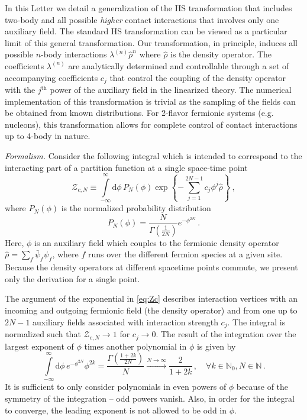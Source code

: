 \documentclass[aps,prl,twocolumn,showpacs,superscriptaddress,groupedaddress, final, nofootinbib]{revtex4}  %
\newcommand{\diff}[1]{\text{d}{#1} \, }
\newcommand{\Z}{\ensuremath{\mathcal{Z}}}
\begin{document}
In this Letter we detail a generalization of the HS transformation that includes two-body and all possible \emph{higher} contact interactions that involves only one auxiliary field.
The standard HS transformation can be viewed as a particular limit of this general transformation.
Our transformation, in principle, induces all possible $n$-body interactions
    $\lambda^{(n)}\hat{\rho}^n$
where $\hat{\rho}$ is the density operator.
The coefficients $\lambda^{(n)}$ are analytically determined and controllable through a set of accompanying coefficients $c_j$ that control the coupling of the density operator with the $j^{\text{th}}$ power of the auxiliary field in the linearized theory.
The numerical implementation of this transformation is trivial as the sampling of the fields can be obtained from known distributions.
For 2-flavor fermionic systems (e.g. nucleons), this transformation allows for complete control of contact interactions up to 4-body in nature.

\emph{Formalism.}\label{sec:formalism}
Consider the following integral which is intended to correspond to the interacting part of a partition function at a single space-time point
\begin{equation}
	\label{eq:Zc}
	\Z_{c, N} 
	\equiv
	\int\limits_{-\infty}^\infty \diff{\phi} P_N(\phi)
		\exp\left\{ - \sum\limits_{j=1}^{2N-1} c_j \phi^j \hat
                  \rho \right\}\ ,
\end{equation}
where $P_N(\phi)$ is the normalized probability distribution
\begin{equation}
P_N(\phi)= 	\frac{N}{ \Gamma \left( \frac{1}{2N}  \right) } e^{ - \phi^{2N}} \ .
\end{equation}
Here, $\phi$ is an auxiliary field which couples to the fermionic density operator $\hat \rho = \sum_{f} {\bar{\psi}}_{f} \psi_{f}$, where $f$ runs over the different fermion species at a given site.
Because the density operators at different spacetime points commute, we present only the derivation for a single point.

The argument of the exponential in \eqref{eq:Zc} describes interaction vertices with an incoming and outgoing fermionic field (the density operator) and from one up to $2N-1$ auxiliary fields associated with interaction strength $c_j$.
The integral is normalized such that $\Z_{c, N} \to 1$ for $c_j \to 0$.
The result of the integration over the largest exponent of $\phi$ times another polynomial in $\phi$ is given by
{\small\begin{equation}
	\int\limits_{-\infty}^\infty \diff{\phi} e^{ - \phi^{2N}} \phi^{2k}
	=
	\frac{
		\Gamma\left(\frac{1 + 2 k}{2 N}\right)
	}{N}
	\overset{N\to\infty}{\longrightarrow}
	\frac{2}{1 + 2 k}
	\, , \quad
	\forall k \in \mathbb{N}_0, N \in \mathbb{N}
	\, .
\end{equation}}
It is sufficient to only consider polynomials in even powers of $\phi$ because of the symmetry of the integration -- odd powers vanish.
Also, in order for the integral to converge, the leading exponent is not allowed to be odd in $\phi$.
\end{document}
